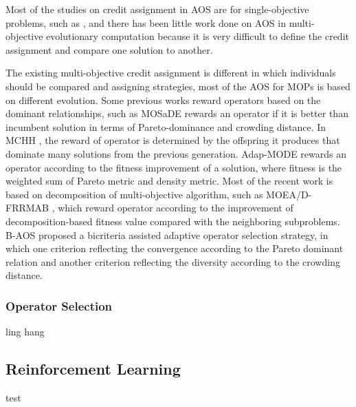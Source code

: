 \documentclass[journal]{IEEEtran}
\begin{document}
Most of the studies on credit assignment in AOS are for single-objective problems, such as \cite{fialho2009dynamic,fialho2009dynamic,cowling2000hyperheuristic}, and there has been little work done on AOS in multi-objective evolutionary computation because it is very difficult to define the credit assignment and compare one solution to another.

The existing multi-objective credit assignment is different in which individuals should be compared and assigning strategies, most of the AOS for MOPs is based on different evolution.
Some previous works reward operators based on the dominant relationships,
such as MOSaDE \cite{huang2007multi} rewards an operator if it is better than incumbent solution in terms of Pareto-dominance and crowding distance.
In MCHH \cite{mcclymont2011markov}, the reward of operator is determined by the offspring it produces that dominate many solutions from the previous generation. Adap-MODE \cite{li2011multi} rewards an operator according to the fitness improvement of a solution, where fitness is the weighted sum of Pareto metric and density metric.
Most of the recent work is based on decomposition of multi-objective algorithm, such as MOEA/D-FRRMAB \cite{frrmab}, which reward operator according to the improvement of decomposition-based fitness value compared with the neighboring subproblems.
B-AOS \cite{lin2021decomposition} proposed a bicriteria assisted adaptive operator selection strategy, in which one criterion reflecting the convergence according to the Pareto dominant relation and another criterion reflecting the diversity according to the crowding distance.


\subsubsection{Operator Selection}

ling hang

\subsection{Reinforcement Learning}
test
\end{document}
